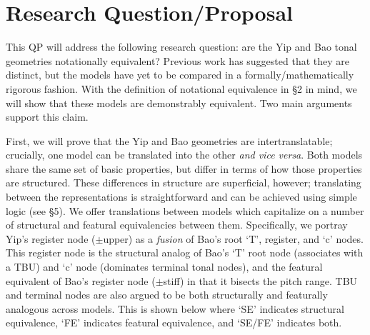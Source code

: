 \documentclass{article}
\begin{document}
\section{Research Question/Proposal}
This QP will address the following research question: are the Yip and Bao tonal geometries notationally equivalent? Previous work has suggested that they are distinct, but the models have yet to be compared in a formally/mathematically rigorous fashion. With the definition of notational equivalence in \S 2 in mind, we will show that these models are demonstrably equivalent. Two main arguments support this claim.\par
First, we will prove that the Yip and Bao geometries are intertranslatable; crucially, one model can be translated into the other \emph{and vice versa}. Both models share the same set of basic properties, but differ in terms of how those properties are structured. These differences in structure are superficial, however; translating between the representations is straightforward and can be achieved using simple logic (see \S5). We offer translations between models which capitalize on a number of structural and featural equivalencies between them. Specifically, we portray Yip's register node ($\pm$upper) as a \emph{fusion} of Bao's root `T', register, and `c' nodes. This register node is the structural analog of Bao's `T' root node (associates with a TBU) and `c' node (dominates terminal tonal nodes), and the featural equivalent of Bao's register node ($\pm$stiff) in that it bisects the pitch range. TBU and terminal nodes are also argued to be both structurally and featurally analogous across models. This is shown below where `SE' indicates structural equivalence, `FE' indicates featural equivalence, and `SE/FE' indicates both.
\begin{center}
\end{center}
\end{document}
